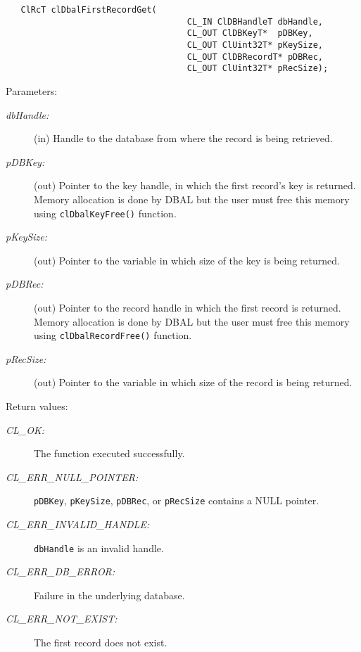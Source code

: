 \begin{flushleft}
\begin{Desc}
\footnotesize\begin{verbatim}   ClRcT clDbalFirstRecordGet(
                                	CL_IN ClDBHandleT dbHandle,
                                	CL_OUT ClDBKeyT*  pDBKey,
                                	CL_OUT ClUint32T* pKeySize,
                                	CL_OUT ClDBRecordT* pDBRec,
                                	CL_OUT ClUint32T* pRecSize);
\end{verbatim}
\normalsize
\end{Desc}
\begin{Desc}
\item[Parameters:]
\begin{description}
\item[{\em db\-Handle:}](in) Handle to the database from where the record is being retrieved.
\item[{\em p\-DBKey:}](out) Pointer to the key handle, in which 
the first record's key is returned. Memory allocation is done by DBAL but the user must free this memory using {\tt{cl\-Dbal\-Key\-Free()}} function.
\item[{\em p\-Key\-Size:}](out) Pointer to the variable in which size of the key is being returned.
\item[{\em p\-DBRec:}](out) Pointer to the record handle in which the first record is returned. Memory allocation is done by DBAL but the user must free 
this memory using {\tt{cl\-Dbal\-Record\-Free()}} function.
\item[{\em p\-Rec\-Size:}](out) Pointer to the variable in which size of the record is being returned.\end{description}
\end{Desc}
\begin{Desc}
\item[Return values:]
\begin{description}
\item[{\em CL\_\-OK:}]The function executed successfully. 
\item[{\em CL\_\-ERR\_\-NULL\_\-POINTER:}]{\tt{pDBKey}}, {\tt{pKeySize}}, {\tt{pDBRec}}, or {\tt{pRecSize}} contains a NULL pointer. 
\item[{\em CL\_\-ERR\_\-INVALID\_\-HANDLE:}]{\tt{dbHandle}} is an invalid handle. 
\item[{\em CL\_\-ERR\_\-DB\_\-ERROR:}]Failure in the underlying database. 
\item[{\em CL\_\-ERR\_\-NOT\_\-EXIST:}]The first record does not exist.\end{description}
\end{Desc}

\end{flushleft}
